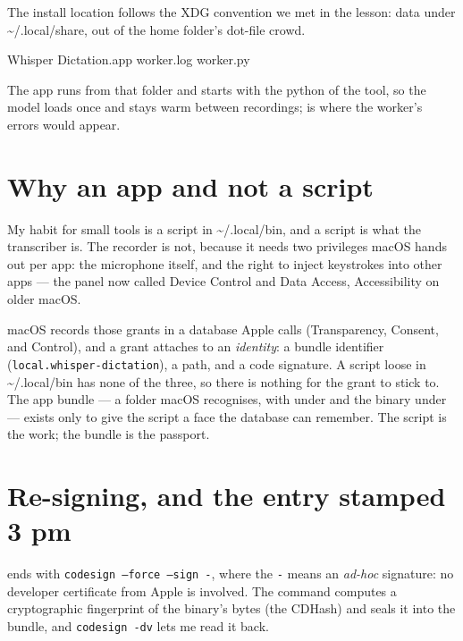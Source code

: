 \documentclass[11pt,a4paper]{article}
\newcommand{\home}{\textasciitilde}  %
\begin{document}
The install location follows the XDG convention we met in the  lesson: data under \home/.local/share, out of the home folder's dot-file crowd.

\begin{cmdout}
Whisper Dictation.app
worker.log
worker.py
\end{cmdout}

The app runs from that folder and starts  with the python of the   tool, so the model loads once and stays warm between recordings;  is where the worker's errors would appear.

\section{Why an app and not a script}

My habit for small tools is a script in \home/.local/bin, and a script is what the transcriber is. The recorder is not, because it needs two privileges macOS hands out per app: the microphone itself, and the right to inject keystrokes into other apps --- the panel now called Device Control and Data Access, Accessibility on older macOS.

macOS records those grants in a database Apple calls  (Transparency, Consent, and Control), and a grant attaches to an \emph{identity}: a bundle identifier (\texttt{local.whisper-dictation}), a path, and a code signature. A script loose in \home/.local/bin has none of the three, so there is nothing for the grant to stick to. The app bundle --- a folder macOS recognises, with  under  and the binary under  --- exists only to give the script a face the database can remember. The script is the work; the bundle is the passport.

\section{Re-signing, and the entry stamped 3 pm}

 ends with \texttt{codesign --force --sign -}, where the \texttt{-} means an \emph{ad-hoc} signature: no developer certificate from Apple is involved. The command computes a cryptographic fingerprint of the binary's bytes (the CDHash) and seals it into the bundle, and \texttt{codesign -dv} lets me read it back.
\end{document}
